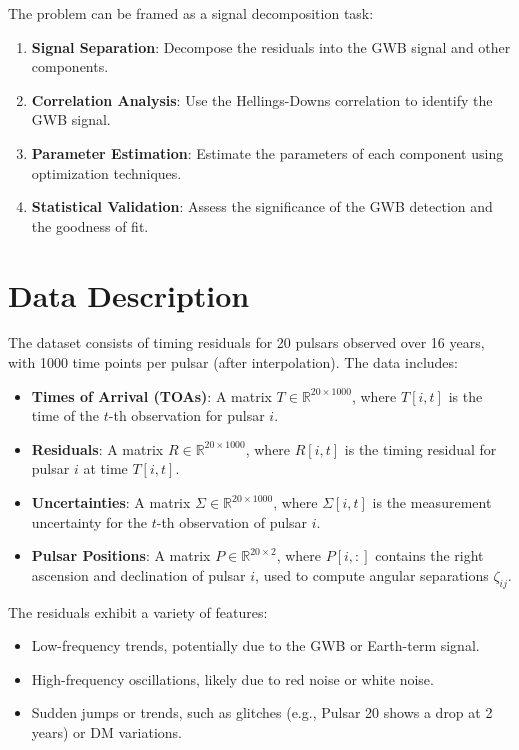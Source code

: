 \documentclass[11pt]{article}
\begin{document}
The problem can be framed as a signal decomposition task:
\begin{enumerate}
    \item \textbf{Signal Separation}: Decompose the residuals into the GWB signal and other components.
    \item \textbf{Correlation Analysis}: Use the Hellings-Downs correlation to identify the GWB signal.
    \item \textbf{Parameter Estimation}: Estimate the parameters of each component using optimization techniques.
    \item \textbf{Statistical Validation}: Assess the significance of the GWB detection and the goodness of fit.
\end{enumerate}

\section{Data Description}
The dataset consists of timing residuals for 20 pulsars observed over 16 years, with 1000 time points per pulsar (after interpolation). The data includes:
\begin{itemize}
    \item \textbf{Times of Arrival (TOAs)}: A matrix $T \in \mathbb{R}^{20 \times 1000}$, where $T[i, t]$ is the time of the $t$-th observation for pulsar $i$.
    \item \textbf{Residuals}: A matrix $R \in \mathbb{R}^{20 \times 1000}$, where $R[i, t]$ is the timing residual for pulsar $i$ at time $T[i, t]$.
    \item \textbf{Uncertainties}: A matrix $\Sigma \in \mathbb{R}^{20 \times 1000}$, where $\Sigma[i, t]$ is the measurement uncertainty for the $t$-th observation of pulsar $i$.
    \item \textbf{Pulsar Positions}: A matrix $P \in \mathbb{R}^{20 \times 2}$, where $P[i, :]$ contains the right ascension and declination of pulsar $i$, used to compute angular separations $\zeta_{ij}$.
\end{itemize}

The residuals exhibit a variety of features:
\begin{itemize}
    \item Low-frequency trends, potentially due to the GWB or Earth-term signal.
    \item High-frequency oscillations, likely due to red noise or white noise.
    \item Sudden jumps or trends, such as glitches (e.g., Pulsar 20 shows a drop at 2 years) or DM variations.
\end{itemize}
\end{document}
